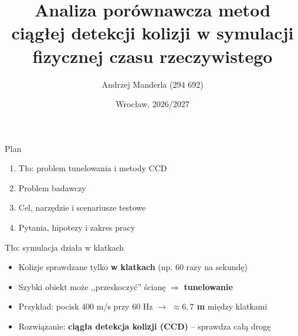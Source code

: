 \documentclass[aspectratio=169, 11pt]{beamer}
\title[Analiza porównawcza metod CCD]{Analiza porównawcza metod ciągłej detekcji kolizji w symulacji fizycznej czasu rzeczywistego}
\author{Andrzej Manderla (294 692)}
\date{Wrocław, 2026/2027}
\begin{document}

\pwrtitleframe

\begin{frame}{Plan}
  \Large
  \begin{enumerate}\itemsep0.5em
    \item Tło: problem tunelowania i metody CCD
    \item Problem badawczy
    \item Cel, narzędzie i scenariusze testowe
    \item Pytania, hipotezy i zakres pracy
  \end{enumerate}
\end{frame}

\begin{frame}{Tło: symulacja działa w klatkach}
  \begin{center}
  \end{center}
  \begin{itemize}
    \item Kolizje sprawdzane tylko \textbf{w klatkach} (np. 60 razy na sekundę)
    \item Szybki obiekt może ,,przeskoczyć'' ścianę $\Rightarrow$ \textbf{tunelowanie}
    \item Przykład: pocisk 400 m/s przy 60 Hz $\to$ \textbf{$\approx 6{,}7$ m} między klatkami
    \item Rozwiązanie: \textbf{ciągła detekcja kolizji (CCD)} -- sprawdza całą drogę
  \end{itemize}
\end{frame}
\end{document}
